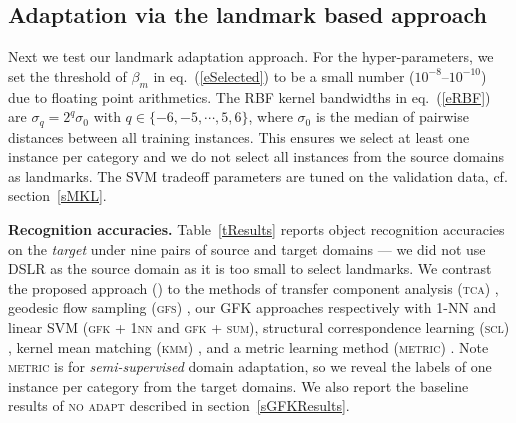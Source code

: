 \subsection{Adaptation via the landmark based approach}
\label{sLandmarkResults}

Next we test our landmark adaptation approach.  For the hyper-parameters, we set the threshold of $\beta_m$ in eq.~(\ref{eSelected}) to be a small number ($10^{-8}$--$10^{-10}$) due to floating point arithmetics. {The RBF kernel bandwidths in eq.~(\ref{eRBF}) are $\sigma_q = 2^q\sigma_0$ with $q\in\{-6, -5, \cdots, 5, 6\}$, where $\sigma_0$ is the median of pairwise distances between all training instances. This ensures} we select at least one instance per category and we do not select all instances from the source domains as landmarks.  The SVM tradeoff parameters are tuned on the validation data, cf. section~\ref{sMKL}.  %

{\bf Recognition accuracies.} Table~\ref{tResults} reports object recognition accuracies on the \emph{target} under nine pairs of source and target domains --- we did not use DSLR as the source domain  as it is too small to select landmarks. We contrast the proposed approach (\ours) to the methods of transfer component analysis (\textsc{tca}) \cite{tca}, geodesic flow sampling (\textsc{gfs}) \cite{gopalan2011domain}, our GFK approaches respectively with 1-NN and linear SVM (\textsc{gfk + 1nn} and \textsc{gfk + sum}), structural correspondence learning (\textsc{scl}) \cite{BlitzerEMNLP06Domain}, kernel mean matching (\textsc{kmm}) \cite{huang07correcting}, and a metric learning method (\textsc{metric}) \cite{saenko2010adapting}. Note \textsc{metric} is for \emph{semi-supervised} domain adaptation, so we reveal the labels of one instance per category from the target domains. We also report the baseline results of \textsc{no adapt} described in section~\ref{sGFKResults}.%

